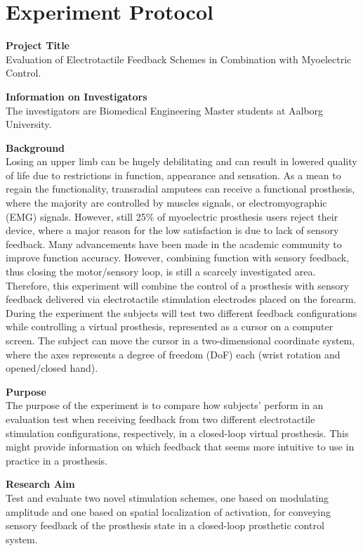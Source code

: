 \section{Experiment Protocol} \label{Ex_protocol}

\textbf{Project Title} \\
Evaluation of Electrotactile Feedback Schemes in
Combination with Myoelectric Control. 

\textbf{Information on Investigators} \\
The investigators are Biomedical Engineering Master students at Aalborg University. 

\textbf{Background} \\
Losing an upper limb can be hugely debilitating and can result in lowered quality of life due to restrictions in function, appearance and sensation. As a mean to regain the functionality, transradial amputees can receive a functional prosthesis, where the majority are controlled by muscles signals, or electromyographic (EMG) signals. However, still 25\% of myoelectric prosthesis users reject their device, where a major reason for the low satisfaction is due to lack of sensory feedback.
Many advancements have been made in the academic community to improve function accuracy. However, combining function with sensory feedback, thus closing the motor/sensory loop, is still a scarcely investigated area. Therefore, this experiment will combine the control of a prosthesis with sensory feedback delivered via electrotactile stimulation electrodes placed on the forearm. During the experiment the subjects will test two different feedback configurations while controlling a virtual prosthesis, represented as a cursor on a computer screen. The subject can move the cursor in a two-dimensional coordinate system, where the axes represents a degree of freedom (DoF) each (wrist rotation and opened/closed hand).

\textbf{Purpose} \\
The purpose of the experiment is to compare how subjects' perform in an evaluation test when receiving feedback from two different electrotactile stimulation configurations, respectively, in a closed-loop virtual prosthesis. This might provide information on which feedback that seems more intuitive to use in practice in a prosthesis.

\textbf{Research Aim} \\
Test and evaluate two novel stimulation schemes, one based on modulating amplitude and one based on spatial localization of activation, for conveying sensory feedback of the prosthesis state in a closed-loop prosthetic control system.

